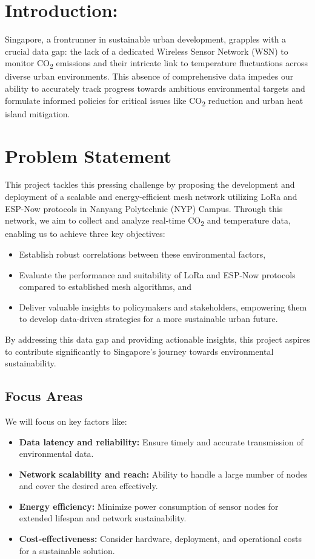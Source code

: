 \section*{Introduction:}\label{sec:introduction}
Singapore, a frontrunner in sustainable urban development, grapples with a crucial data gap: the lack of a dedicated Wireless Sensor Network (WSN) to monitor CO\textsubscript{2} emissions and their intricate link to temperature fluctuations across diverse urban environments. This absence of comprehensive data impedes our ability to accurately track progress towards ambitious environmental targets and formulate informed policies for critical issues like CO\textsubscript{2} reduction and urban heat island mitigation.

\section*{Problem Statement}\label{sec:problem_statement}
This project tackles this pressing challenge by proposing the development and deployment of a scalable and energy-efficient mesh network utilizing LoRa and ESP-Now protocols in Nanyang Polytechnic (NYP) Campus. Through this network, we aim to collect and analyze real-time CO\textsubscript{2} and temperature data, enabling us to achieve three key objectives:

\begin{itemize}
    \item Establish robust correlations between these environmental factors,
    \item Evaluate the performance and suitability of LoRa and ESP-Now protocols compared to established mesh algorithms, and
    \item Deliver valuable insights to policymakers and stakeholders, empowering them to develop data-driven strategies for a more sustainable urban future.
\end{itemize}

By addressing this data gap and providing actionable insights, this project aspires to contribute significantly to Singapore's journey towards environmental sustainability.

\subsection*{Focus Areas}\label{sec:focus_areas}
We will focus on key factors like:
\begin{itemize}
    \item \textbf{Data latency and reliability:} Ensure timely and accurate transmission of environmental data.
    \item \textbf{Network scalability and reach:} Ability to handle a large number of nodes and cover the desired area effectively.
    \item \textbf{Energy efficiency:} Minimize power consumption of sensor nodes for extended lifespan and network sustainability.
    \item \textbf{Cost-effectiveness:} Consider hardware, deployment, and operational costs for a sustainable solution.
\end{itemize}
